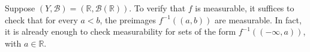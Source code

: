\begin{example}
    Suppose $(Y, \mathcal{B}) = (\mathbb{R}, \mathcal{B}(\mathbb{R}))$. To verify that $f$ is measurable, it suffices to check that for every $a < b$, the preimages $f^{-1}((a,b))$ are measurable. In fact, it is already enough to check measurability for sets of the form $f^{-1}((-\infty,a))$, with $a \in \mathbb{R}$.
\end{example}


%
%
%
%


